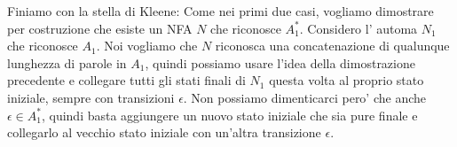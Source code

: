 Finiamo con la stella di Kleene:
Come nei primi due casi, vogliamo dimostrare per costruzione che esiste un NFA $ N $ che riconosce $ A_1^* $. Considero l' automa $ N_1 $ che riconosce $ A_1 $. Noi vogliamo che $ N $ riconosca una concatenazione di qualunque lunghezza di parole in $ A_1 $, quindi possiamo usare l'idea della dimostrazione precedente e collegare tutti gli stati finali di $ N_1 $ questa volta al proprio stato iniziale, sempre con transizioni $ \epsilon $. Non possiamo dimenticarci pero' che anche $ \epsilon \in A_1^* $, quindi basta aggiungere un nuovo stato iniziale che sia pure finale e collegarlo al vecchio stato iniziale con un'altra transizione $ \epsilon $.
